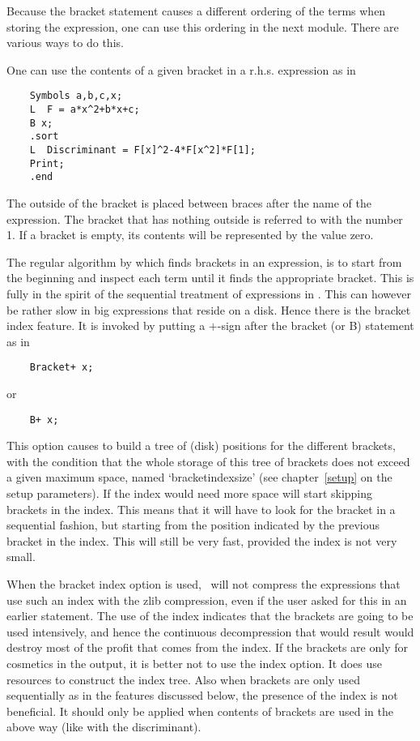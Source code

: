 Because the bracket statement causes a different ordering of the terms when 
storing the expression, one can use this ordering in the next module. There 
are various ways to do this.

One can use the contents of a given bracket in a r.h.s. expression as in
\begin{verbatim}
    Symbols a,b,c,x;
    L  F = a*x^2+b*x+c;
    B x;
    .sort
    L  Discriminant = F[x]^2-4*F[x^2]*F[1];
    Print;
    .end
\end{verbatim}
The outside of the bracket is placed between braces after the 
name of the expression. The bracket that has nothing outside is referred to 
with the number 1. If a bracket is empty, its contents will be represented 
by the value zero.

The regular algorithm by which \FORM{} finds brackets in an expression, is 
to start from the beginning and inspect each term until it finds the 
appropriate bracket. This is fully in the spirit of the sequential 
treatment of expressions in \FORM{}. This can however be rather 
slow in big 
expressions that reside on a disk. Hence there is the bracket 
index 
feature. It is invoked by putting a $+$-sign after the bracket (or B) 
statement as in 
\begin{verbatim}
    Bracket+ x;
\end{verbatim}
or
\begin{verbatim}
    B+ x;
\end{verbatim}
This option causes \FORM{} to build a tree of (disk) positions for the 
different brackets, with the condition that the whole storage of this tree 
of brackets does not exceed a given maximum space, named 
`bracketindexsize' 
(see chapter~\ref{setup} on the setup parameters). 
If the index would need more space \FORM{} will start 
skipping brackets in the index. This means that it will have to look for 
the bracket in a sequential fashion, but starting from the position 
indicated by the previous bracket in the index. This will still be very 
fast, provided the index is not very small.

When the bracket index option is used, \FORM\ will not compress the 
expressions that use such an index with the zlib compression, even if the 
user asked for this in an earlier statement. The use of the index indicates 
that the brackets are going to be used intensively, and hence the 
continuous decompression that would result would destroy most of the profit 
that comes from the index. If the brackets are only for cosmetics in the 
output, it is better not to use the index option. It does use resources to 
construct the index tree. Also when 
brackets are only used sequentially as in the features discussed below, the 
presence of the index is not beneficial. It should only be applied when 
contents of brackets are used in the above way (like with the 
discriminant).

